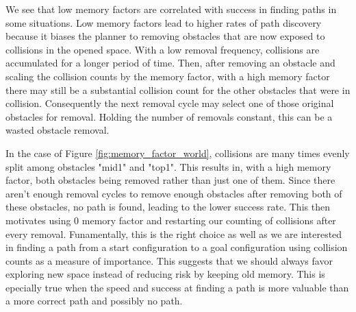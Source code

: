 We see that low memory factors are correlated with success in finding paths in some situations. Low memory factors lead to higher rates of path discovery because it biases the planner to removing obstacles that are now exposed to collisions in the opened space. With a low removal frequency, collisions are accumulated for a longer period of time. Then, after removing an obstacle and scaling the collision counts by the memory factor, with a high memory factor there may still be a substantial collision count for the other obstacles that were in collision. Consequently the next removal cycle may select one of those original obstacles for removal. Holding the number of removals constant, this can be a wasted obstacle removal. 

In the case of Figure \ref{fig:memory_factor_world}, collisions are many times evenly split among obstacles "mid1" and "top1". This results in, with a high memory factor, both obstacles being removed rather than just one of them. Since there aren't enough removal cycles to remove enough obstacles after removing both of these obstacles, no path is found, leading to the lower success rate. This then motivates using 0 memory factor and restarting our counting of collisions after every removal. Funamentally, this is the right choice as well as we are interested in finding a path from a start configuration to a goal configuration using collision counts as a measure of importance. This suggests that we should always favor exploring new space instead of reducing risk by keeping old memory. This is epecially true when the speed and success at finding a path is more valuable than a more correct path and possibly no path.


